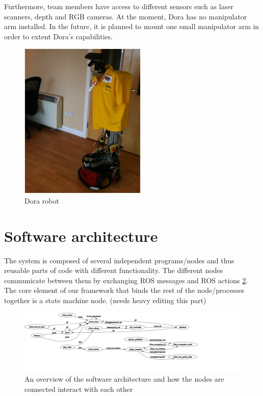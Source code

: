 \documentclass[conference]{IEEEtran}
\begin{document}
Furthermore, team members have access to different sensors such as laser scanners, depth and RGB cameras. At the moment, Dora has no manipulator arm installed. In the future, it is planned to mount one small manipulator arm in order to extent Dora's capabilities.

\begin{figure}[!t]
\centering
\includegraphics[width=2.in]{dorafinal.jpg}
\caption{Dora robot}
\label{fig:dora}
\end{figure}

\section{Software architecture}
The system is composed of several independent programs/nodes and thus reusable parts of code with different functionality. The different nodes communicate between them by exchanging ROS messages and ROS actions \ref{fig:nodes}. The core element of our framework that binds the rest of the node/processes together is a state machine node. (needs heavy editing this part)

\begin{figure}[!t]
\centering
\includegraphics[width=\textwidth]{nodes.png}
\caption{An overview of the software architecture and how the nodes are connected interact with each other}
\label{fig:nodes}
\end{figure}
\end{document}
